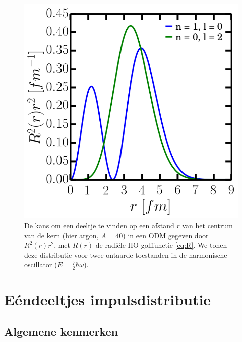\documentclass[11pt,twoside]{book}
\begin{document}
\begin{figure}[H]
\centering
\includegraphics[scale=0.40]{./figuren/waves.png}
\caption{De kans om een deeltje te vinden op een afstand $r$ van het centrum van de kern (hier argon, $A= 40$) in een ODM gegeven door $R^2(r)r^2$, met $R(r)$ de radi\"{e}le HO golffunctie \eqref{eq:R}. We tonen deze distributie voor twee ontaarde toestanden in de harmonische oscillator  ($E = \frac{7}{2} \hbar \omega$).}
\label{fig:ho_waves}
\end{figure}





\chapter{E\'{e}ndeeltjes impulsdistributie} \label{eendeeltjes}
\section{Algemene kenmerken}
\end{document}
